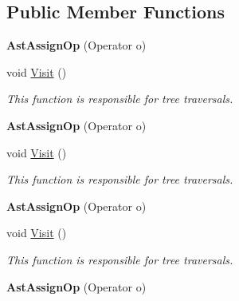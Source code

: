 \subsection*{Public Member Functions}
\begin{DoxyCompactItemize}
\item 
\hypertarget{classAstAssignOp_a456b3f679bb212a0520ca400536aa814}{{\bfseries Ast\-Assign\-Op} (Operator o)}\label{classAstAssignOp_a456b3f679bb212a0520ca400536aa814}

\item 
void \hyperlink{classAstAssignOp_a97614556953225b2fedc821732d9fa27}{Visit} ()
\begin{DoxyCompactList}\small\item\em This function is responsible for tree traversals. \end{DoxyCompactList}\item 
\hypertarget{classAstAssignOp_a456b3f679bb212a0520ca400536aa814}{{\bfseries Ast\-Assign\-Op} (Operator o)}\label{classAstAssignOp_a456b3f679bb212a0520ca400536aa814}

\item 
void \hyperlink{classAstAssignOp_a97614556953225b2fedc821732d9fa27}{Visit} ()
\begin{DoxyCompactList}\small\item\em This function is responsible for tree traversals. \end{DoxyCompactList}\item 
\hypertarget{classAstAssignOp_a456b3f679bb212a0520ca400536aa814}{{\bfseries Ast\-Assign\-Op} (Operator o)}\label{classAstAssignOp_a456b3f679bb212a0520ca400536aa814}

\item 
void \hyperlink{classAstAssignOp_a97614556953225b2fedc821732d9fa27}{Visit} ()
\begin{DoxyCompactList}\small\item\em This function is responsible for tree traversals. \end{DoxyCompactList}\item 
\hypertarget{classAstAssignOp_a456b3f679bb212a0520ca400536aa814}{{\bfseries Ast\-Assign\-Op} (Operator o)}\label{classAstAssignOp_a456b3f679bb212a0520ca400536aa814}


\end{DoxyCompactItemize}
